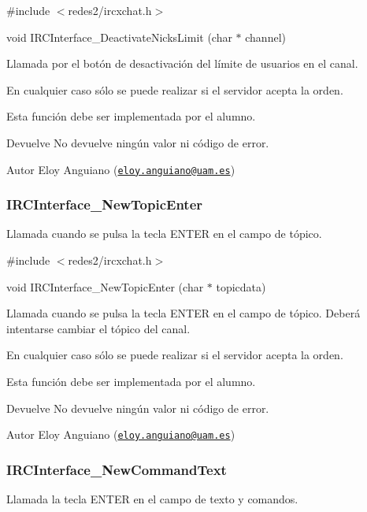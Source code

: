 \#include $<$redes2/ircxchat.\-h$>$

void I\-R\-C\-Interface\-\_\-\-Deactivate\-Nicks\-Limit (char $\ast$ channel)

Llamada por el botón de desactivación del límite de usuarios en el canal.

En cualquier caso sólo se puede realizar si el servidor acepta la orden.

Esta función debe ser implementada por el alumno.

\begin{DoxyReturn}{Devuelve}
No devuelve ningún valor ni código de error.
\end{DoxyReturn}
\begin{DoxyAuthor}{Autor}
Eloy Anguiano (\href{mailto:eloy.anguiano@uam.es}{\tt eloy.\-anguiano@uam.\-es})
\end{DoxyAuthor}


 \hypertarget{IRCInterface_NewTopicEnter}{}\subsubsection{I\-R\-C\-Interface\-\_\-\-New\-Topic\-Enter}\label{IRCInterface_NewTopicEnter}
Llamada cuando se pulsa la tecla E\-N\-T\-E\-R en el campo de tópico.

\#include $<$redes2/ircxchat.\-h$>$

void I\-R\-C\-Interface\-\_\-\-New\-Topic\-Enter (char $\ast$ topicdata)

Llamada cuando se pulsa la tecla E\-N\-T\-E\-R en el campo de tópico. Deberá intentarse cambiar el tópico del canal.

En cualquier caso sólo se puede realizar si el servidor acepta la orden.

Esta función debe ser implementada por el alumno.

\begin{DoxyReturn}{Devuelve}
No devuelve ningún valor ni código de error.
\end{DoxyReturn}
\begin{DoxyAuthor}{Autor}
Eloy Anguiano (\href{mailto:eloy.anguiano@uam.es}{\tt eloy.\-anguiano@uam.\-es})
\end{DoxyAuthor}


 \hypertarget{IRCInterface_NewCommandText}{}\subsubsection{I\-R\-C\-Interface\-\_\-\-New\-Command\-Text}\label{IRCInterface_NewCommandText}
Llamada la tecla E\-N\-T\-E\-R en el campo de texto y comandos.


